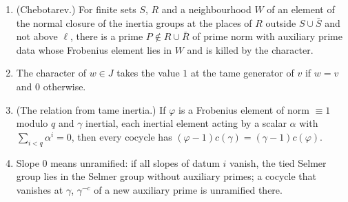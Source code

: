 \begin{proposition}\label{prop:aux-primes}
\begin{enumerate}[label=\textup{(\alph*)}]
\item (Chebotarev.) For finite sets $S$, $R$ and a neighbourhood $W$ of an element of the normal closure of the inertia groups at the places of $R$ outside $S\cup\bar S$ and not above $\ell$, there is a prime $P\notin R\cup\bar R$ of prime norm with
auxiliary prime data whose Frobenius element lies in $W$ and is killed by the character.
\item The character of $w\in J$ takes the value $1$ at the tame generator of $v$ if $w=v$ and $0$ otherwise.
\item (The relation from tame inertia.) If $\varphi$ is a Frobenius element of norm $\equiv1$ modulo $q$ and $\gamma$ inertial, each inertial element acting by a scalar $\alpha$ with $\sum_{i<q}\alpha^i=0$, then every cocycle has
$(\varphi-1)c(\gamma)=(\gamma-1)c(\varphi)$.
\item Slope $0$ means unramified: if all slopes of datum $i$ vanish, the tied Selmer group lies in the Selmer group without auxiliary primes; a cocycle that vanishes at $\gamma$, $\gamma^{-c}$ of a new auxiliary prime is unramified there.
\end{enumerate}
\end{proposition}

